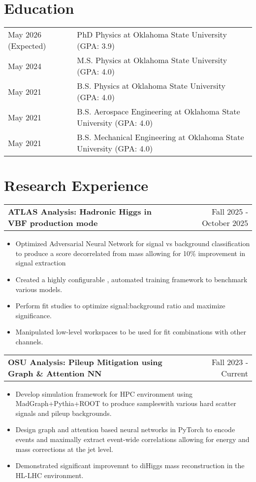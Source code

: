 \documentclass[a4paper,12pt]{article}
\makeatletter
\newenvironment{joblong}[2]
    {
    \begin{tabularx}{\linewidth}{@{}l X r@{}}
    \textbf{#1} & \hfill &  #2 \\[3.75pt]
    \end{tabularx}
    \begin{minipage}[t]{\linewidth}
    \begin{itemize}[nosep,after=\strut, leftmargin=1em, itemsep=2pt,label=--]
    }
    {
    \end{itemize}
    \end{minipage}
    }
\makeatother
\begin{document}
\section{Education}
\begin{tabularx}{\linewidth}{@{}l X@{}}	
May 2026 (Expected) & PhD Physics at Oklahoma State University \hfill \normalsize (GPA: 3.9) \\

May 2024 & M.S. Physics at Oklahoma State University \hfill (GPA: 4.0) \\ 

May 2021 & B.S. Physics at Oklahoma State University \hfill (GPA: 4.0) \\ 

May 2021 & B.S. Aerospace Engineering at Oklahoma State University \hfill (GPA: 4.0) \\ 

May 2021 & B.S. Mechanical Engineering at Oklahoma State University \hfill (GPA: 4.0) \\ 

\end{tabularx}

\section{Research Experience}

\begin{joblong}{ATLAS Analysis: Hadronic Higgs in VBF production mode}{Fall 2025 - October 2025}
\item Optimized Adversarial Neural Network for signal vs background classification to produce a score decorrelated from mass allowing for 10\% improvement in signal extraction
\item Created a highly configurable , automated training framework to benchmark various models.
\item Perform fit studies to optimize signal:background ratio and maximize significance.
\item Manipulated low-level workspaces to be used for fit combinations with other channels.
\end{joblong}

\begin{joblong}{OSU Analysis: Pileup Mitigation using Graph \& Attention NN}{Fall 2023 - Current}
\item Develop simulation framework for HPC environment using MadGraph+Pythia+ROOT to produce sampleswith various hard scatter signals and pileup backgrounds.
\item Design graph and attention based neural networks in PyTorch to encode events and maximally extract event-wide correlations allowing for energy and mass corrections at the jet level.
\item Demonstrated significant improvemnt to diHiggs mass reconstruction in the HL-LHC environment.
\end{joblong}
\end{document}
